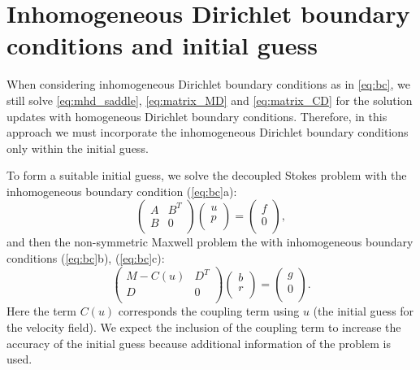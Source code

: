 \section{Inhomogeneous Dirichlet boundary conditions and initial guess}
\label{sec:bcig}


When considering inhomogeneous Dirichlet boundary conditions as in \eqref{eq:bc}, we still solve \eqref{eq:mhd_saddle}, \eqref{eq:matrix_MD} and \eqref{eq:matrix_CD} for the solution updates with homogeneous Dirichlet boundary conditions. Therefore, in this approach we must incorporate the inhomogeneous Dirichlet boundary conditions only within the initial guess.


To form a suitable initial guess, we solve the decoupled Stokes problem with the inhomogeneous boundary condition (\ref{eq:bc}a):
\begin{equation} \label{eq:StokesInitial}
\left(
\begin{array}{cc}
A & B^T \\
B & 0 \\
\end{array}
\right)
\left(
\begin{array}{c}
u \\
p \\
\end{array}
\right)=\left(
\begin{array}{c}
f \\
0 \\
\end{array}
\right),
\end{equation}
and then the non-symmetric Maxwell problem the with inhomogeneous boundary conditions (\ref{eq:bc}b), (\ref{eq:bc}c):
\begin{equation} \label{eq:MaxwellInitial}
\left(
\begin{array}{cc}
M -C(u) & D^T \\
D & 0 \\
\end{array}
\right)
\left(
\begin{array}{c}
b \\
r \\
\end{array}
\right)=\left(
\begin{array}{c}
g \\
0 \\
\end{array}
\right).
\end{equation}
Here the term $C(u)$ corresponds the coupling term using $u$ (the initial guess for the velocity field). We expect the inclusion of the coupling term to increase the accuracy of the initial guess because additional information of the problem is used.


